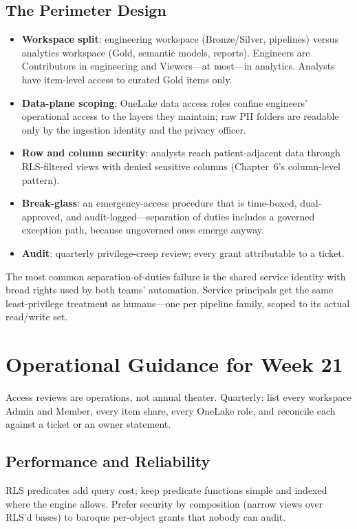 \subsection{The Perimeter Design}
\begin{itemize}
    \item \textbf{Workspace split}: engineering workspace (Bronze/Silver, pipelines) versus analytics workspace (Gold, semantic models, reports). Engineers are Contributors in engineering and Viewers---at most---in analytics. Analysts have item-level access to curated Gold items only.
    \item \textbf{Data-plane scoping}: OneLake data access roles confine engineers' operational access to the layers they maintain; raw PII folders are readable only by the ingestion identity and the privacy officer.
    \item \textbf{Row and column security}: analysts reach patient-adjacent data through RLS-filtered views with denied sensitive columns (Chapter~6's column-level pattern).
    \item \textbf{Break-glass}: an emergency-access procedure that is time-boxed, dual-approved, and audit-logged---separation of duties includes a governed exception path, because ungoverned ones emerge anyway.
    \item \textbf{Audit}: quarterly privilege-creep review; every grant attributable to a ticket.
\end{itemize}

\begin{pitfall}
The most common separation-of-duties failure is the shared service identity with broad rights used by both teams' automation. Service principals get the same least-privilege treatment as humans---one per pipeline family, scoped to its actual read/write set.
\end{pitfall}

\section{Operational Guidance for Week 21}
Access reviews are operations, not annual theater. Quarterly: list every workspace Admin and Member, every item share, every OneLake role, and reconcile each against a ticket or an owner statement.

\subsection{Performance and Reliability}
RLS predicates add query cost; keep predicate functions simple and indexed where the engine allows. Prefer security by composition (narrow views over RLS'd bases) to baroque per-object grants that nobody can audit.

